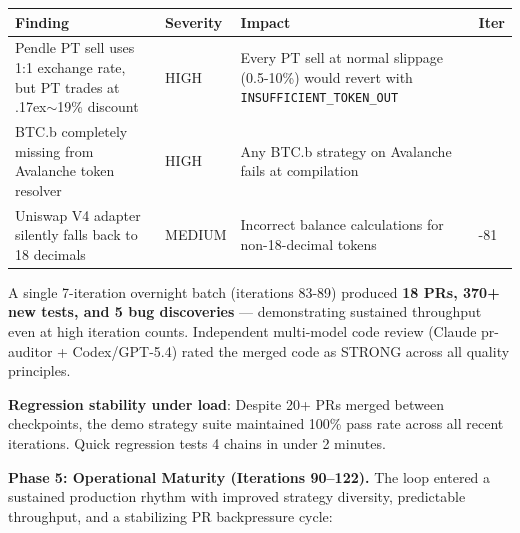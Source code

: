 \documentclass[11pt,a4paper]{article}
\newcounter{none} %
\newcommand{\roughly}{{\textraisebox{.17ex}{$\scriptstyle\sim$}}}
\newcommand{\textraisebox}[2]{\leavevmode\raise#1\hbox{#2}}
\begin{document}
{\small{} %
\begin{longtable}[]{@{}
  >{\raggedright\arraybackslash}p{}
  >{\raggedright\arraybackslash}p{}
  >{\raggedright\arraybackslash}p{}
  >{\raggedright\arraybackslash}p{}@{}}
\toprule\noalign{}
\begin{minipage}[b]{\linewidth}\raggedright
Finding
\end{minipage} & \begin{minipage}[b]{\linewidth}\raggedright
Severity
\end{minipage} & \begin{minipage}[b]{\linewidth}\raggedright
Impact
\end{minipage} & \begin{minipage}[b]{\linewidth}\raggedright
Iter
\end{minipage} \\
\midrule\noalign{}
\endhead
\bottomrule\noalign{}
\endlastfoot
Pendle PT sell uses 1:1 exchange rate, but PT trades at \roughly19\% discount & HIGH & Every PT sell at normal slippage (0.5-10\%) would revert with \texttt{INSUFFICIENT\_TOKEN\_OUT} & 89 \\
BTC.b completely missing from Avalanche token resolver & HIGH & Any BTC.b strategy on Avalanche fails at compilation & 83 \\
Uniswap V4 adapter silently falls back to 18 decimals & MEDIUM & Incorrect balance calculations for non-18-decimal tokens & 80-81 \\
\end{longtable}
}

A single 7-iteration overnight batch (iterations 83-89) produced \textbf{18 PRs, 370+ new tests, and 5 bug discoveries} --- demonstrating sustained throughput even at high iteration counts. Independent multi-model code review (Claude pr-auditor + Codex/GPT-5.4) rated the merged code as STRONG across all quality principles.

\textbf{Regression stability under load}: Despite 20+ PRs merged between checkpoints, the demo strategy suite maintained 100\% pass rate across all recent iterations. Quick regression tests 4 chains in under 2 minutes.

\textbf{Phase 5: Operational Maturity (Iterations 90--122).} The loop entered a sustained production rhythm with improved strategy diversity, predictable throughput, and a stabilizing PR backpressure cycle:
\end{document}
